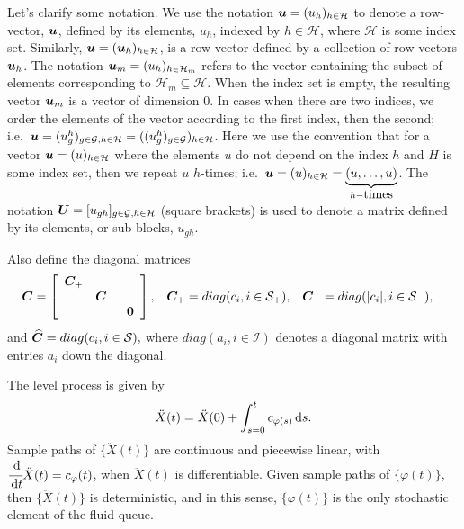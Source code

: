 {Let's clarify some notation. We use the notation \(\boldsymbol u = (u_h)_{h\in \mathcal H}\) to denote a row-vector, \(\boldsymbol u\), defined by its elements, \(u_h\), indexed by \(h\in\mathcal H\), where \(\mathcal H\) is some index set. Similarly, \(\boldsymbol u = (\boldsymbol u_h)_{h\in\mathcal H}\), is a row-vector defined by a collection of row-vectors \(\boldsymbol u_h\). The notation \(\boldsymbol u_m=(u_h)_{h\in\mathcal H_m}\) refers to the vector containing the subset of elements corresponding to \(\mathcal H_m\subseteq \mathcal H\). When the index set is empty, the resulting vector \(\boldsymbol u_m\) is a vector of dimension 0. In cases when there are two indices, we order the elements of the vector according to the first index, then the second; i.e.~\(\boldsymbol u = (u_{g}^h)_{g\in\mathcal G,h\in\mathcal H} = ((u_g^h)_{g\in\mathcal G})_{h\in\mathcal H}\). Here we use the convention that for a vector \(\boldsymbol u=(u)_{h\in \mathcal H}\) where the elements \(u\) do not depend on the index \(h\) and \(H\) is some index set, then we repeat \(u\) \(h\)-times; i.e.~\(\boldsymbol u = (u)_{h\in \mathcal H} =\underbrace{(u,\dots,u)}_{h-\mbox{times}}\). The notation \(\boldsymbol U = [u_{gh}]_{g\in\mathcal G, h\in\mathcal H}\) (square brackets) is used to denote a matrix defined by its elements, or sub-blocks, \(u_{gh}\).} 

Also define the diagonal matrices 
\begin{align*}
	\boldsymbol C &= \left[\begin{array}{ccc} \boldsymbol C_+ && \\ &\boldsymbol C_-& \\ && \boldsymbol 0\end{array}\right], && \boldsymbol C_+ = diag(c_i,i\in\mathcal{S}_+), && \boldsymbol C_- = diag(|c_i|,i\in\mathcal{S}_-),
\end{align*}
and 
\(
	\widehat{\boldsymbol C} = diag(c_i,i\in\mathcal{S}),
\)
where \(diag(a_i,i\in\mathcal I)\) denotes a diagonal matrix with entries \(a_i\) down the diagonal. 

The level process is given by 
\[\ddot X(t) = \ddot X(0) + \int_{s=0}^t c_{\varphi(s)}\, \mathrm{d} s.\]
Sample paths of \(\{\ddot X (t)\}\) are continuous and piecewise linear, with \(\cfrac{\, \mathrm{d} }{\, \mathrm{d} t} \ddot X(t) = c_\varphi(t)\), when \(\ddot X(t)\) is differentiable. Given sample paths of \(\{\varphi(t)\}\), then \(\{\ddot X(t)\}\) is deterministic, and in this sense, \(\{\varphi(t)\}\) is the only stochastic element of the fluid queue. 

